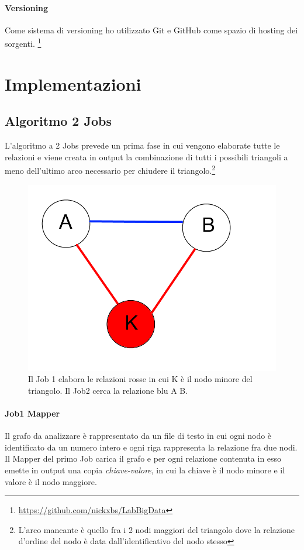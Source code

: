 \documentclass[paper=a4, fontsize=11pt]{scrartcl}	%
\numberwithin{equation}{section}															%
\numberwithin{figure}{section}																%
\numberwithin{table}{section}																%
\begin{document}
\paragraph{Versioning}
Come sistema di versioning ho utilizzato Git e GitHub come spazio di hosting dei sorgenti.
\footnote{\href{https://github.com/nickxbs/LabBigData}{https://github.com/nickxbs/LabBigData}}


\section{Implementazioni}
\subsection{Algoritmo 2 Jobs}
L'algoritmo a 2 Jobs prevede un prima fase in cui vengono elaborate tutte le relazioni e viene creata in output la combinazione di tutti i possibili triangoli a meno dell'ultimo arco necessario per chiudere il triangolo.\footnote{L'arco mancante è quello fra i 2 nodi maggiori del triangolo dove la relazione d'ordine del nodo è data dall'identificativo del nodo stesso} \\


\begin{figure}[h]
\centering
        \includegraphics[totalheight=6cm]{Graph1.png}
    \caption{Il Job 1 elabora le relazioni rosse in cui K è il nodo minore del triangolo. Il Job2 cerca la relazione blu A B.}
    \label{fig:verticalcell} 
\end{figure}
\paragraph{Job1 Mapper}
Il grafo da analizzare è rappresentato da un file di testo in cui ogni nodo è identificato da un numero intero e ogni riga rappresenta la relazione fra due nodi.\\
Il Mapper del primo Job carica il grafo e per ogni relazione contenuta in esso emette in output una copia \textit{chiave-valore}, in cui la chiave è il nodo minore e il valore è il nodo maggiore.
\end{document}
